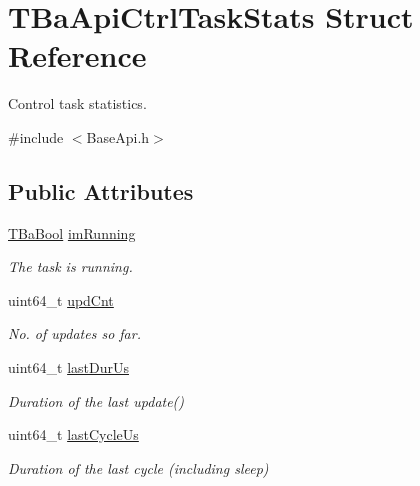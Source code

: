 \hypertarget{structTBaApiCtrlTaskStats}{}\section{T\+Ba\+Api\+Ctrl\+Task\+Stats Struct Reference}
\label{structTBaApiCtrlTaskStats}


Control task statistics.  




{\ttfamily \#include $<$Base\+Api.\+h$>$}

\subsection*{Public Attributes}
\begin{DoxyCompactItemize}
\item 
\hypertarget{structTBaApiCtrlTaskStats_a5991a4b35aec43477fee7d8634268e5e}{}\hyperlink{BaBool_8h_a5fe1eb8d6ba045ac2251a8f369c2e7b6}{T\+Ba\+Bool} \hyperlink{structTBaApiCtrlTaskStats_a5991a4b35aec43477fee7d8634268e5e}{im\+Running}\label{structTBaApiCtrlTaskStats_a5991a4b35aec43477fee7d8634268e5e}

\begin{DoxyCompactList}\small\item\em The task is running. \end{DoxyCompactList}\item 
\hypertarget{structTBaApiCtrlTaskStats_a2d2fd92a156a13e4370b0780af633b4e}{}uint64\+\_\+t \hyperlink{structTBaApiCtrlTaskStats_a2d2fd92a156a13e4370b0780af633b4e}{upd\+Cnt}\label{structTBaApiCtrlTaskStats_a2d2fd92a156a13e4370b0780af633b4e}

\begin{DoxyCompactList}\small\item\em No. of updates so far. \end{DoxyCompactList}\item 
\hypertarget{structTBaApiCtrlTaskStats_ad7f03c51dc4304d96c3a4800cdfe32ce}{}uint64\+\_\+t \hyperlink{structTBaApiCtrlTaskStats_ad7f03c51dc4304d96c3a4800cdfe32ce}{last\+Dur\+Us}\label{structTBaApiCtrlTaskStats_ad7f03c51dc4304d96c3a4800cdfe32ce}

\begin{DoxyCompactList}\small\item\em Duration of the last {\ttfamily update()} \end{DoxyCompactList}\item 
\hypertarget{structTBaApiCtrlTaskStats_af283fbcd6b2606313931d905a4b44f2a}{}uint64\+\_\+t \hyperlink{structTBaApiCtrlTaskStats_af283fbcd6b2606313931d905a4b44f2a}{last\+Cycle\+Us}\label{structTBaApiCtrlTaskStats_af283fbcd6b2606313931d905a4b44f2a}

\begin{DoxyCompactList}\small\item\em Duration of the last cycle (including sleep) \end{DoxyCompactList}\end{DoxyCompactItemize}


